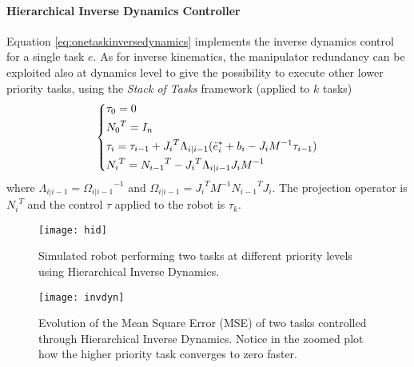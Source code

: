 \paragraph{Hierarchical Inverse Dynamics Controller}
Equation \eqref{eq:onetaskinversedynamics} implements the inverse dynamics control for a single task $e$. As for inverse kinematics, the manipulator redundancy can be exploited also at dynamics level to give the possibility to execute other lower priority tasks, using the \textit{Stack of Tasks} framework (applied to $k$ tasks)
\begin{equation}
\begin{dcases}
\tau_0 = 0\\
{N_0}^T = I_n\\
\tau_i = \tau_{i-1} + {J_i}^T\Lambda_{i\vert i-1}({\ddot{e}_i}^* + b_i - J_{i}M^{-1}\tau_{i-1}) \\
{N_i}^T = {N_{i-1}}^T - {J_i}^T\Lambda_{i\vert i-1}J_{i}M^{-1}
\end{dcases}
\end{equation}
where $\Lambda_{i\vert i-1} = {\Omega_{i\vert i-1}}^{-1}$ and ${\Omega_{i\vert i-1}} = {J_i}^{T}M^{-1}{N_{i-1}}^TJ_i$. The projection operator is ${N_i}^T$ and the control $\tau$ applied to the robot is $\tau_k$.

\begin{figure}
\centering
\texttt{[image: hid]}
\caption{Simulated robot performing two tasks at different priority levels using Hierarchical Inverse Dynamics.}
\end{figure}

\begin{figure}
\centering
\texttt{[image: invdyn]}
\caption[Evolution of the Mean Square Error (MSE) of two tasks controlled through Hierarchical Inverse Dynamics.]{Evolution of the Mean Square Error (MSE) of two tasks controlled through Hierarchical Inverse Dynamics. Notice in the zoomed plot how the higher priority task converges to zero faster.}
\end{figure}

